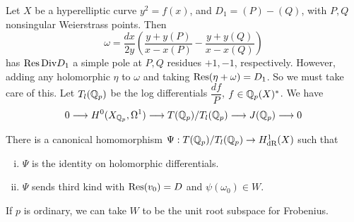\begin{ex}
Let $X$ be a hyperelliptic curve $y^2= f(x)$, and $D_1= (P) - (Q)$, with $P,Q$ nonsingular Weierstrass points. Then
	\[
	\omega= \dfrac{dx}{2y} \left( \dfrac{y+y(P)}{x-x(P)} - \dfrac{y+y(Q)}{x-x(Q)} \right)
	\]
has $\operatorname{Res} \text{Div} D_1$  a simple pole at $P,Q$ residues $+1,-1$, respectively. However, adding any holomorphic $\eta$ to $\omega$ and taking $\operatorname{Res}(\eta+\omega)= D_1$. So we must take care of this. Let $T_l(\mathbb{Q}_p)$ be the log differentials $\dfrac{df}{P}$, $f \in \mathbb{Q}_p(X)^*$. We have 	\[
	0 \stackrel{}{\longrightarrow} H^0(X_{\mathbb{Q}_p}, \Omega^1) \stackrel{}{\longrightarrow} T(\mathbb{Q}_p)/T_l(\mathbb{Q}_p) \stackrel{}{\longrightarrow} J(\mathbb{Q}_p) \stackrel{}{\longrightarrow} 0
	\]
\end{ex}


\begin{prop}
There is a canonical homomorphism $\Psi: T(\mathbb{Q}_p)/T_l(\mathbb{Q}_p) \to H_{\text{dR}}^1(X)$ such that

\begin{enumerate}[(i)]
\item $\Psi$ is the identity on holomorphic differentials.
\item $\Psi$ sends third kind with $\operatorname{Res}(v_0)= D$ and $\psi(\omega_0) \in W$.
\end{enumerate}
\end{prop}


\begin{rem}
If $p$ is ordinary, we can take $W$ to be the unit root subspace for Frobenius. 
\end{rem}































